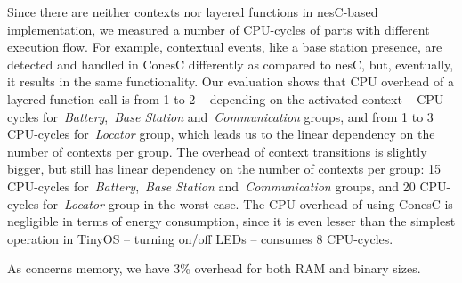 Since there are neither contexts nor layered functions in nesC-based
implementation, we measured a number of CPU-cycles of parts with different
execution flow. For example, contextual events, like a base station presence,
are detected and handled in ConesC differently as compared to nesC, but,
eventually, it results in the same functionality. Our evaluation shows that CPU overhead of
a layered function call is from 1 to 2 -- depending on the activated context -- CPU-cycles
for~\emph{Battery},~\emph{Base Station} and~\emph{Communication} groups, and from
1 to 3 CPU-cycles for~\emph{Locator} group, which leads us to the linear dependency on the
number of contexts per group. The overhead of context transitions is slightly bigger, but still has
linear dependency on the number of contexts per group: 15 CPU-cycles
for~\emph{Battery},~\emph{Base Station} and~\emph{Communication} groups, and 20
CPU-cycles for~\emph{Locator} group in the worst case. The CPU-overhead of using ConesC is
negligible in terms of energy consumption, since it is even lesser than the simplest operation in
TinyOS -- turning on/off LEDs -- consumes 8 CPU-cycles.

As concerns memory, we have 3\% overhead for both RAM and binary sizes.

